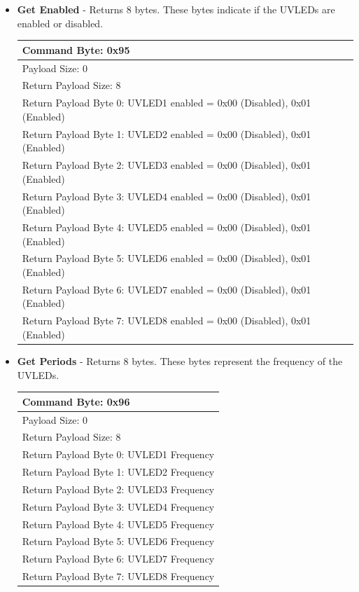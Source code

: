 \documentclass[12pt, a4paper]{article}
\begin{document}
\begin{itemize}
\item \textbf{Get Enabled} - Returns 8 bytes. These bytes indicate if the UVLEDs are enabled or disabled.\\
\begin{flushleft}
\begin{tabular}{|l|}
\hline
Command Byte: 0x95															\\ \hline
Payload Size: 0																\\ \hline
Return Payload Size: 8														\\ \hline
Return Payload Byte 0: UVLED1 enabled =  0x00 (Disabled), 0x01 (Enabled)	\\ \hline
Return Payload Byte 1: UVLED2 enabled =  0x00 (Disabled), 0x01 (Enabled)	\\ \hline
Return Payload Byte 2: UVLED3 enabled =  0x00 (Disabled), 0x01 (Enabled)	\\ \hline
Return Payload Byte 3: UVLED4 enabled =  0x00 (Disabled), 0x01 (Enabled)	\\ \hline
Return Payload Byte 4: UVLED5 enabled =  0x00 (Disabled), 0x01 (Enabled)	\\ \hline
Return Payload Byte 5: UVLED6 enabled =  0x00 (Disabled), 0x01 (Enabled)	\\ \hline
Return Payload Byte 6: UVLED7 enabled =  0x00 (Disabled), 0x01 (Enabled)	\\ \hline
Return Payload Byte 7: UVLED8 enabled =  0x00 (Disabled), 0x01 (Enabled)	\\ \hline
\end{tabular}
\end{flushleft}

\item \textbf{Get Periods} - Returns 8 bytes. These bytes represent the frequency of the UVLEDs.\\
\begin{flushleft}
\begin{tabular}{|l|}
\hline
Command Byte: 0x96														\\ \hline
Payload Size: 0															\\ \hline
Return Payload Size: 8													\\ \hline
Return Payload Byte 0: UVLED1 Frequency									\\ \hline
Return Payload Byte 1: UVLED2 Frequency									\\ \hline
Return Payload Byte 2: UVLED3 Frequency									\\ \hline
Return Payload Byte 3: UVLED4 Frequency									\\ \hline
Return Payload Byte 4: UVLED5 Frequency									\\ \hline
Return Payload Byte 5: UVLED6 Frequency									\\ \hline
Return Payload Byte 6: UVLED7 Frequency									\\ \hline
Return Payload Byte 7: UVLED8 Frequency									\\ \hline
\end{tabular}
\end{flushleft}
\end{itemize}
\pagebreak
\end{document}
